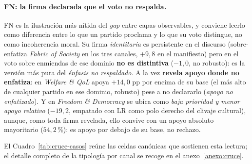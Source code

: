 \paragraph{FN: la firma declarada que el voto no respalda.}
FN es la ilustración más nítida del \emph{gap} entre capas observables, y conviene
leerlo como diferencia entre lo que un partido proclama y lo que su voto distingue,
no como incoherencia moral. Su firma \emph{identitaria} es persistente en el
discurso (sobre-enfatiza \emph{Fabric of Society} en los tres canales, $+9{,}8$
en el manifiesto) pero en el voto sobre enmiendas de ese dominio \textbf{no es
distintiva} ($-1{,}0$, no robusto): es la versión más pura del \emph{énfasis no
respaldado}. A la vez \textbf{revela apoyo donde no enfatiza}: en \emph{Welfare
\& QoL} apoya $+14{,}0$ pp por encima de su base (el más alto de cualquier partido
en ese dominio, robusto) pese a no declararlo (\emph{apoyo no enfatizado}). Y
en \emph{Freedom \& Democracy} se ubica como \emph{baja prioridad y menor apoyo
relativo} ($-19{,}2$, empatado con LR como polo derecho del clivaje cultural),
aunque, como toda firma revelada, ello convive con un apoyo absoluto mayoritario
($54{,}2\,\%$): es apoyo por debajo de su base, no rechazo.

El Cuadro~\ref{tab:cruce-casos} reúne las celdas canónicas que sostienen esta
lectura; el detalle completo de la tipología por canal se recoge en el
anexo~\ref{anexo:cruce}.

